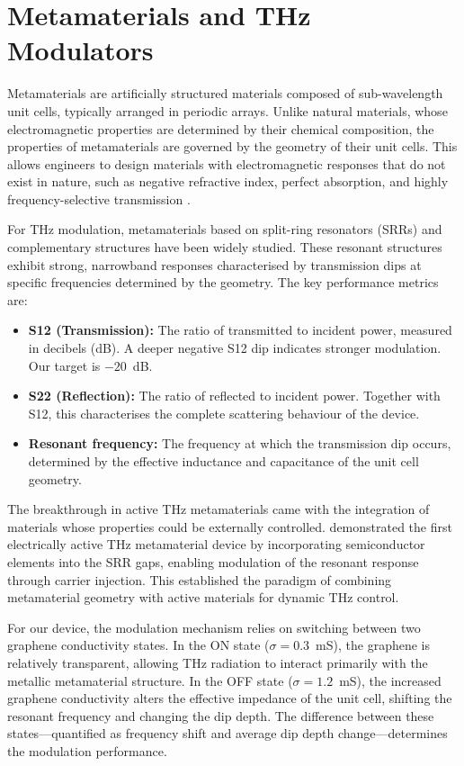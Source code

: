 \documentclass[12pt,a4paper]{report}
\begin{document}
\section{Metamaterials and THz Modulators}
\label{sec:metamaterials}

Metamaterials are artificially structured materials composed of sub-wavelength unit cells, typically arranged in periodic arrays. Unlike natural materials, whose electromagnetic properties are determined by their chemical composition, the properties of metamaterials are governed by the geometry of their unit cells. This allows engineers to design materials with electromagnetic responses that do not exist in nature, such as negative refractive index, perfect absorption, and highly frequency-selective transmission \citep{pendry1999, smith2000}.

For THz modulation, metamaterials based on split-ring resonators (SRRs) and complementary structures have been widely studied. These resonant structures exhibit strong, narrowband responses characterised by transmission dips at specific frequencies determined by the geometry. The key performance metrics are:

\begin{itemize}[leftmargin=2cm]
    \item \textbf{S12 (Transmission):} The ratio of transmitted to incident power, measured in decibels (dB). A deeper negative S12 dip indicates stronger modulation. Our target is $-20$~dB.
    \item \textbf{S22 (Reflection):} The ratio of reflected to incident power. Together with S12, this characterises the complete scattering behaviour of the device.
    \item \textbf{Resonant frequency:} The frequency at which the transmission dip occurs, determined by the effective inductance and capacitance of the unit cell geometry.
\end{itemize}

The breakthrough in active THz metamaterials came with the integration of materials whose properties could be externally controlled. \citet{chen2006} demonstrated the first electrically active THz metamaterial device by incorporating semiconductor elements into the SRR gaps, enabling modulation of the resonant response through carrier injection. This established the paradigm of combining metamaterial geometry with active materials for dynamic THz control.

For our device, the modulation mechanism relies on switching between two graphene conductivity states. In the ON state ($\sigma = 0.3$~mS), the graphene is relatively transparent, allowing THz radiation to interact primarily with the metallic metamaterial structure. In the OFF state ($\sigma = 1.2$~mS), the increased graphene conductivity alters the effective impedance of the unit cell, shifting the resonant frequency and changing the dip depth. The difference between these states---quantified as frequency shift and average dip depth change---determines the modulation performance.
\end{document}
